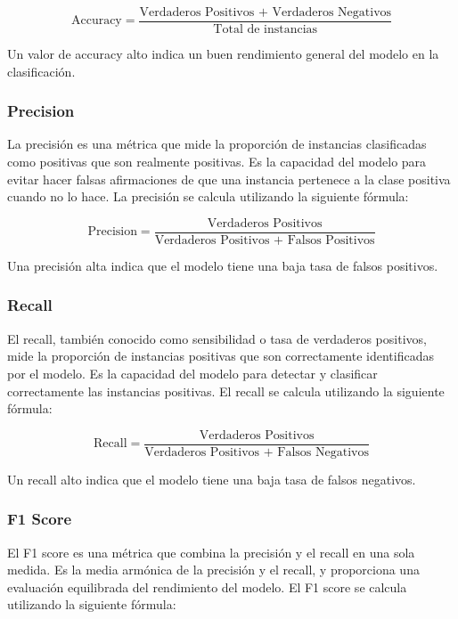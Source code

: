 \begin{equation}
\text{Accuracy} = \frac{\text{Verdaderos Positivos + Verdaderos Negativos}}{\text{Total de instancias}}
\end{equation}

Un valor de accuracy alto indica un buen rendimiento general del modelo en la clasificación.

\subsubsection{Precision}
La precisión es una métrica que mide la proporción de instancias clasificadas como positivas que son realmente positivas. Es la capacidad del modelo para evitar hacer falsas afirmaciones de que una instancia pertenece a la clase positiva cuando no lo hace. La precisión se calcula utilizando la siguiente fórmula:

\begin{equation}
\text{Precision} = \frac{\text{Verdaderos Positivos}}{\text{Verdaderos Positivos + Falsos Positivos}}
\end{equation}

Una precisión alta indica que el modelo tiene una baja tasa de falsos positivos.

\subsubsection{Recall}
El recall, también conocido como sensibilidad o tasa de verdaderos positivos, mide la proporción de instancias positivas que son correctamente identificadas por el modelo. Es la capacidad del modelo para detectar y clasificar correctamente las instancias positivas. El recall se calcula utilizando la siguiente fórmula:

\begin{equation}
\text{Recall} = \frac{\text{Verdaderos Positivos}}{\text{Verdaderos Positivos + Falsos Negativos}}
\end{equation}

Un recall alto indica que el modelo tiene una baja tasa de falsos negativos.

\subsubsection{F1 Score}
El F1 score es una métrica que combina la precisión y el recall en una sola medida. Es la media armónica de la precisión y el recall, y proporciona una evaluación equilibrada del rendimiento del modelo. El F1 score se calcula utilizando la siguiente fórmula:


